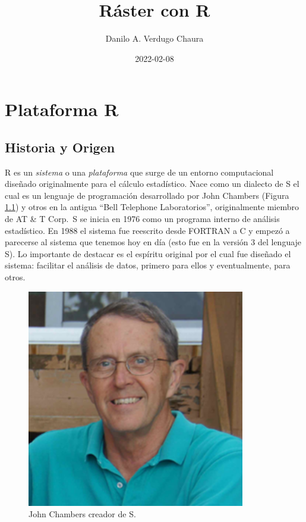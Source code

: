 \documentclass[
]{book}
\title{Ráster con R}
\author{Danilo A. Verdugo Chaura}
\date{2022-02-08}
\begin{document}
\maketitle

{
\setcounter{tocdepth}{1}
\tableofcontents
}
\hypertarget{part1}{%
\chapter{Plataforma R}\label{part1}}

\hypertarget{hist-orig}{%
\section{Historia y Origen}\label{hist-orig}}

R es un \emph{sistema} o una \emph{plataforma} que surge de un entorno computacional diseñado originalmente para el cálculo estadístico. Nace como un dialecto de S el cual es un lenguaje de programación desarrollado por John Chambers (Figura \ref{fig:img-crea-1}) y otros en la antigua ``Bell Telephone Laboratorios'', originalmente miembro de AT \& T Corp.~S se inicia en 1976 como un programa interno de análisis estadístico. En 1988 el sistema fue reescrito desde FORTRAN a C y empezó a parecerse al sistema que tenemos hoy en día (esto fue en la versión 3 del lenguaje S). Lo importante de destacar es el espíritu original por el cual fue diseñado el sistema: facilitar el análisis de datos, primero para ellos y eventualmente, para otros.

\begin{figure}

{\centering \includegraphics[width=3.75in]{img/john-chambers} 

}

\caption{John Chambers creador de S.}\label{fig:img-crea-1}
\end{figure}
\end{document}
